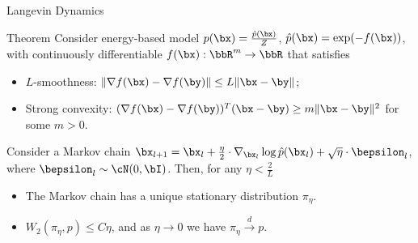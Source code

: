 \documentclass{beamer}
\begin{document}
\begin{frame}{Langevin Dynamics}
	\begin{block}{Theorem}
		Consider energy-based model $p(\bx) = \frac{\hat{p}(\bx)}{Z}$, $\hat{p}(\bx) = \exp(-f(\bx))$, with continuously differentiable $f(\bx): \bbR^m \rightarrow \bbR$ that satisfies
		\begin{itemize}
			\item $L$-smoothness: $\| \nabla f(\bx) - \nabla f(\by)\| \leq L \|\bx - \by \|$;
			\item Strong convexity: $(\nabla f(\bx) - \nabla f(\by))^T(\bx - \by) \geq m \| \bx - \by \|^2 $ for some $m > 0$.
		\end{itemize}
		Consider a Markov chain $\bx_{l + 1} = \bx_l + \frac{\eta}{2} \cdot \nabla_{\bx_l} \log \hat{p}(\bx_l) + \sqrt{\eta} \cdot \bepsilon_l$, where $\bepsilon_l \sim \cN(0, \bI)$.
		Then, for any $\eta < \frac{2}{L}$
		\begin{itemize}
			\item The Markov chain has a unique stationary distribution $\pi_\eta$.
			\item $W_2(\pi_\eta, p) \le C \eta$, and as $\eta \to 0$ we have $\pi_\eta \xrightarrow{d} p$.
		\end{itemize}
	\end{block}
\end{frame}
\end{document}

